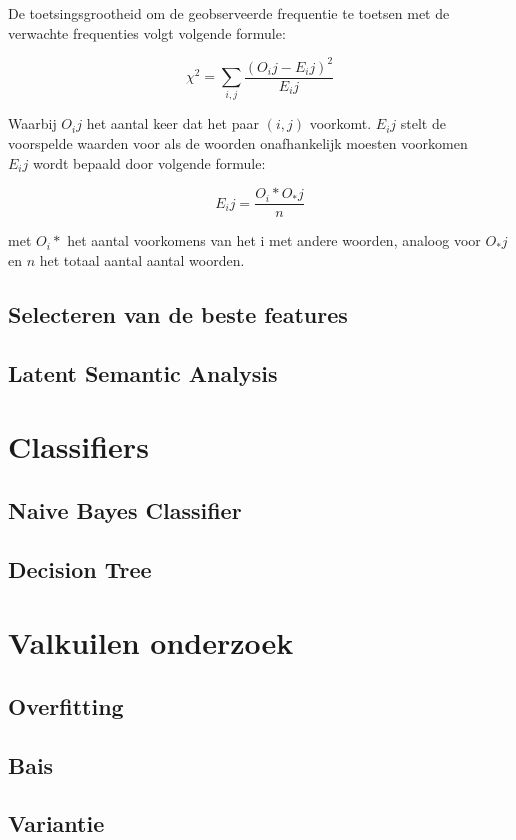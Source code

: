 De toetsingsgrootheid om de geobserveerde frequentie te toetsen met de verwachte frequenties volgt volgende formule:

\[{\chi}^2=\sum_{i,j}^{} \frac{(O_ij - E_ij)^2}{E_ij}\]

Waarbij ${O_ij}$ het aantal keer dat het paar $(i,j)$ voorkomt. $E_ij$ stelt de voorspelde waarden voor als de woorden onafhankelijk moesten voorkomen\\
$E_ij$ wordt bepaald door volgende formule:

\[{E_ij}=\frac{O_i* O_*j}{n}\]

met ${O_i*}$ het aantal voorkomens van het i met andere woorden, analoog voor ${O_*j}$ en ${n}$ het totaal aantal aantal woorden.

\subsection{Selecteren van de beste features}\label{Selecteren van de beste features}



\subsection{Latent Semantic Analysis}\label{Latent Semantic Analysis}


\section{Classifiers}\label{Classifiers}

\subsection{Naive Bayes Classifier}\label{Naive Bayes Classifier}

\subsection{Decision Tree}\label{Decision Tree}

\section{Valkuilen onderzoek}\label{Valkuilen onderzoek}
\subsection{Overfitting}\label{Overfitting}
\subsection{Bais}\label{Bais}
\subsection{Variantie}\label{Variantie}